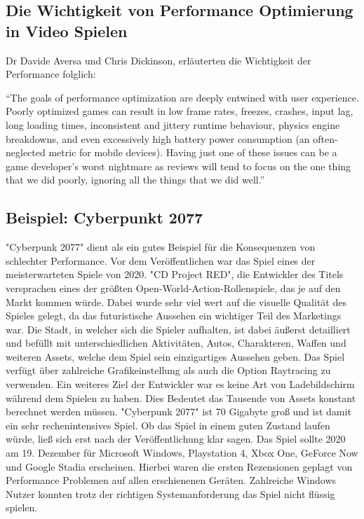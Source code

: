 \subsection{Die Wichtigkeit von Performance Optimierung in Video Spielen}

Dr Davide Aversa und Chris Dickinson, erläuterten die Wichtigkeit der Performance folglich:

"`The goals of performance optimization are deeply entwined with user experience. Poorly optimized games can result in low frame rates, freezes, crashes, input lag, long loading times, inconsistent and jittery runtime behaviour, physics engine breakdowns, and even excessively high battery power consumption (an often-neglected metric for mobile devices). Having just one of these issues can be a game developer's worst nightmare as reviews will tend to focus on the one thing that we did poorly, ignoring all the things that we did well."'\cite[S. 17]{_unity_game_optimization}

\subsection{Beispiel: Cyberpunkt 2077}

"Cyberpunk 2077" dient als ein gutes Beispiel für die Konsequenzen von schlechter Performance. Vor dem Veröffentlichen war das Spiel eines der meisterwarteten Spiele von 2020. "CD Project RED", die Entwickler des Titels versprachen eines der größten Open-World-Action-Rollenspiele, das je auf den Markt kommen würde. Dabei wurde sehr viel wert auf die visuelle Qualität des Spieles gelegt, da das futuristische Aussehen ein wichtiger Teil des Marketings war. Die Stadt, in welcher sich die Spieler aufhalten, ist dabei äußerst detailliert und befüllt mit unterschiedlichen Aktivitäten, Autos, Charakteren, Waffen und weiteren Assets, welche dem Spiel sein einzigartiges Aussehen geben. Das Spiel verfügt über zahlreiche Grafikeinstellung als auch die Option Raytracing zu verwenden. Ein weiteres Ziel der Entwickler war es keine Art von Ladebildschirm während dem Spielen zu haben. Dies Bedeutet das Tausende von Assets konstant berechnet werden müssen. "Cyberpunk 2077" ist 70 Gigabyte groß und ist damit ein sehr rechenintensives Spiel. Ob das Spiel in einem guten Zustand laufen würde, ließ sich erst nach der Veröffentlichung klar sagen. Das Spiel sollte 2020 am 19. Dezember für Microsoft Windows, Playstation 4, Xbox One, GeForce Now und Google Stadia erscheinen. Hierbei waren die ersten Rezensionen geplagt von Performance Problemen auf allen erschienenen Geräten. Zahlreiche Windows Nutzer konnten trotz der richtigen Systemanforderung das Spiel nicht flüssig spielen.


